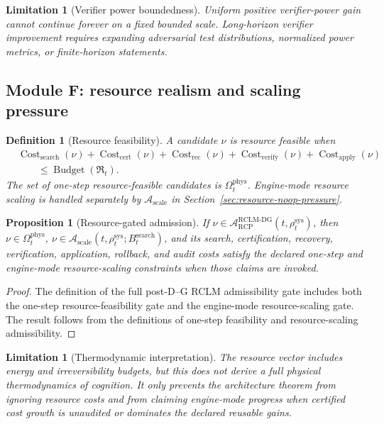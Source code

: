 \documentclass[11pt,a4paper]{article}
\newtheorem{proposition}[theorem]{Proposition}
\newtheorem{definition}[theorem]{Definition}
\newtheorem{limitation}[theorem]{Limitation}
\newcommand{\Acal}{\mathcal A}
\newcommand{\RCP}{\mathrm{RCP}}
\newcommand{\RCLM}{\mathrm{RCLM}}
\newcommand{\DG}{\mathrm{DG}}
\newcommand{\sys}{\mathrm{sys}}
\newcommand{\rec}{\mathrm{rec}}
\newcommand{\Cost}{\operatorname{Cost}}
\newcommand{\Budget}{\operatorname{Budget}}
\newcommand{\phys}{\mathrm{phys}}
\newcommand{\verify}{\mathrm{verify}}
\newcommand{\search}{\mathrm{search}}
\newcommand{\cert}{\mathrm{cert}}
\newcommand{\apply}{\mathrm{apply}}
\newcommand{\scale}{\mathrm{scale}}
\begin{document}
\begin{limitation}[Verifier power boundedness]
Uniform positive verifier-power gain cannot continue forever on a fixed bounded scale. Long-horizon verifier improvement requires expanding adversarial test distributions, normalized power metrics, or finite-horizon statements.
\end{limitation}

\subsection{Module F: resource realism and scaling pressure}

\begin{definition}[Resource feasibility]
A candidate \(\nu\) is resource feasible when
\[
\begin{aligned}
&\Cost_{\search}(\nu)+\Cost_{\cert}(\nu)+\Cost_{\rec}(\nu)+\Cost_{\verify}(\nu)+\Cost_{\apply}(\nu)\\
&\qquad\le\Budget(\mathfrak R_t).
\end{aligned}
\]
The set of one-step resource-feasible candidates is \(\Omega_t^{\phys}\). Engine-mode resource scaling is handled separately by \(\Acal_{\scale}\) in Section~\ref{sec:resource-noop-pressure}.
\end{definition}

\begin{proposition}[Resource-gated admission]
If \(\nu\in\Acal_{\RCP}^{\RCLM\text{-}\DG}(t,\rho_t^{\sys})\), then \(\nu\in\Omega_t^{\phys}\), \(\nu\in\Acal_{\scale}(t,\rho_t^{\sys};B_t^{\search})\), and its search, certification, recovery, verification, application, rollback, and audit costs satisfy the declared one-step and engine-mode resource-scaling constraints when those claims are invoked.
\end{proposition}

\begin{proof}
The definition of the full post-D--G RCLM admissibility gate includes both the one-step resource-feasibility gate and the engine-mode resource-scaling gate. The result follows from the definitions of one-step feasibility and resource-scaling admissibility.
\end{proof}

\begin{limitation}[Thermodynamic interpretation]
The resource vector includes energy and irreversibility budgets, but this does not derive a full physical thermodynamics of cognition. It only prevents the architecture theorem from ignoring resource costs and from claiming engine-mode progress when certified cost growth is unaudited or dominates the declared reusable gains.
\end{limitation}
\end{document}
